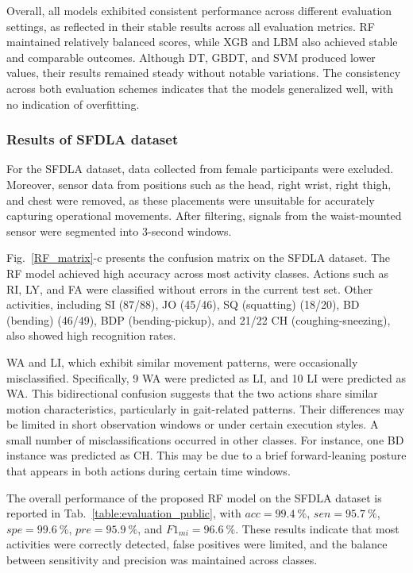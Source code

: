 \documentclass[journal,twoside,web]{ieeecolor}
\begin{document}
Overall, all models exhibited consistent performance across different evaluation settings, as reflected in their stable results across all evaluation metrics. RF maintained relatively balanced scores, while XGB and LBM also achieved stable and comparable outcomes. Although DT, GBDT, and SVM produced lower values, their results remained steady without notable variations. The consistency across both evaluation schemes indicates that the models generalized well, with no indication of overfitting.

\subsubsection{Results of SFDLA dataset}
For the SFDLA dataset, data collected from female participants were excluded. Moreover, sensor data from positions such as the head, right wrist, right thigh, and chest were removed, as these placements were unsuitable for accurately capturing operational movements. After filtering, signals from the waist-mounted sensor were segmented into 3-second windows.

Fig.~\ref{RF_matrix}-c presents the confusion matrix on the SFDLA dataset. The RF model achieved high accuracy across most activity classes. Actions such as RI, LY, and FA were classified without errors in the current test set. Other activities, including SI (87/88), JO (45/46), SQ (squatting) (18/20), BD (bending) (46/49), BDP (bending-pickup), and 21/22 CH (coughing-sneezing), also showed high recognition rates.

 
 WA and LI, which exhibit similar movement patterns, were occasionally misclassified. Specifically, 9 WA were predicted as LI, and 10 LI were predicted as WA. This bidirectional confusion suggests that the two actions share similar motion characteristics, particularly in gait-related patterns. Their differences may be limited in short observation windows or under certain execution styles. A small number of misclassifications occurred in other classes. For instance, one BD instance was predicted as CH. This may be due to a brief forward-leaning posture that appears in both actions during certain time windows.
 
 The overall performance of the proposed RF model on the SFDLA dataset is reported in Tab.~\ref{table:evaluation_public}, with $acc=99.4~\%$, $sen=95.7~\%$, $spe=99.6~\%$, $pre=95.9~\%$, and $F1_{mi}=96.6~\%$. These results indicate that most activities were correctly detected, false positives were limited, and the balance between sensitivity and precision was maintained across classes.
\end{document}
